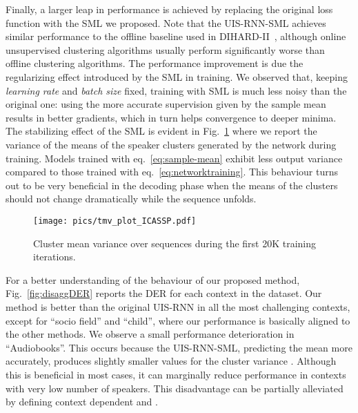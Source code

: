 \documentclass{article}
\begin{document}
Finally, a larger leap in performance is achieved by replacing the original loss function with the \ac{SML} we proposed. Note that the UIS-RNN-SML achieves similar performance to the offline baseline used in DIHARD-II~\cite{Ryant2019}, although online unsupervised clustering algorithms usually perform significantly worse than offline clustering algorithms. The performance improvement is due the regularizing effect introduced by the SML in training. We observed that, keeping \textit{learning rate} and \textit{batch size} fixed, training with SML is much less noisy than the original one: using the more accurate supervision given by the sample mean results in better gradients, which in turn helps convergence to deeper minima. The stabilizing effect of the SML is evident in Fig.~\ref{fig:tmv} where we report the variance of the means of the speaker clusters generated by the network during training. Models trained with eq.~\ref{eq:sample-mean} exhibit less output variance compared to those trained with eq.~\ref{eq:networktraining}. This behaviour turns out to be very beneficial in the decoding phase when the means of the clusters should not change dramatically while the sequence unfolds. 

\begin{figure}[!ht]
\centering
  \texttt{[image: pics/tmv\_plot\_ICASSP.pdf]}
  \caption{Cluster mean variance over sequences during the first 20K training iterations.}
  \label{fig:tmv}
\end{figure}

For a better understanding of the behaviour of our proposed method, Fig.~\ref{fig:disaggDER} reports the \ac{DER} for each context in the dataset. Our method is better than the original UIS-RNN in all the most challenging contexts, except for ``socio field'' and ``child'', where our performance is basically aligned to the other methods. We observe a small performance deterioration in ``Audiobooks''. This occurs because the UIS-RNN-SML, predicting the mean more accurately, produces slightly smaller values for the cluster variance . Although this is beneficial in most cases, it can marginally reduce performance in contexts with very low number of speakers. This disadvantage can be partially alleviated by defining context dependent  and .
\end{document}
